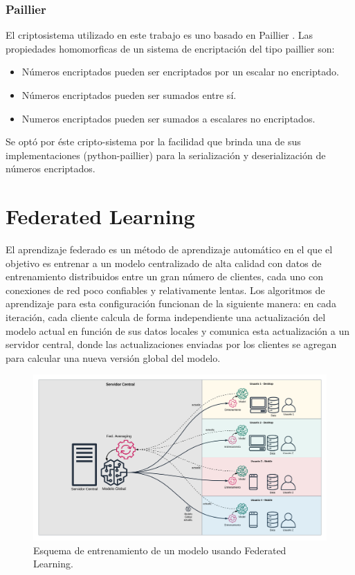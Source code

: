 \documentclass[
11pt, %
oneside, %
spanish, %
singlespacing, %
parskip, %
headsepline, %
chapterinoneline, %
]{MastersDoctoralThesis} %
\begin{document}
\subsubsection*{Paillier}
El criptosistema utilizado en este trabajo es uno basado en Paillier \cite{paillier}. 
Las propiedades homomorficas de un sistema de encriptación del tipo paillier son:

\begin{itemize}
\item Números encriptados pueden ser encriptados por un escalar no encriptado.
\item Números encriptados pueden ser sumados entre sí.
\item Numeros encriptados pueden ser sumados a escalares no encriptados.
\end{itemize}

Se optó por éste cripto-sistema por la facilidad que brinda una de sus implementaciones (python-paillier) para la serialización y deserialización de números encriptados. 

\section{Federated Learning}
El aprendizaje federado \cite{fedlearn2} \cite{fedlearn1} \cite{fedlearn3} \cite{fedlearn4} \cite{fedlearn5} \cite{fedlearn6} es un método de aprendizaje automático en el que el objetivo es entrenar a un modelo centralizado de alta calidad con datos de entrenamiento distribuidos entre un gran número de clientes, cada uno con conexiones de red poco confiables y relativamente lentas. Los algoritmos de aprendizaje para esta configuración funcionan de la siguiente manera: en cada iteración, cada cliente calcula de forma independiente una actualización del modelo actual en función de sus datos locales y comunica esta actualización a un servidor central, donde las actualizaciones enviadas por los clientes se agregan para calcular una nueva versión global del modelo.

\begin{figure}[H]
  	\centering
	\includegraphics[scale=0.42]{imgs/fl_flow.png}
	\caption{Esquema de entrenamiento de un modelo usando Federated Learning.}
\end{figure}
\end{document}
